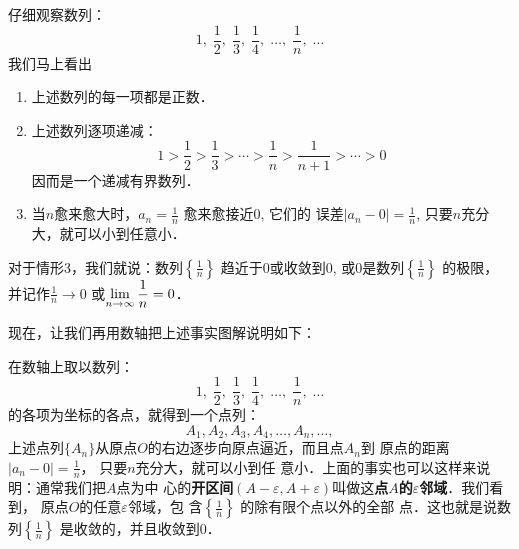 \begin{example}
    仔细观察数列：
    \[1,\; \frac{1}{2},\;\frac{1}{3},\;\frac{1}{4},\; \ldots,\;\frac{1}{n},\;\ldots\]
我们马上看出
\begin{enumerate}
    \item 上述数列的每一项都是正数．
    \item 上述数列逐项递减：
\[1>\frac{1}{2}>\frac{1}{3}>\cdots>\frac{1}{n}>\frac{1}{n+1}>\cdots>0\]
因而是一个递减有界数列．
\item 当$n$愈来愈大时，$a_n=\frac{1}{n}$
愈来愈接近0, 它们的
误差$|a_n-0|=\frac{1}{n}$, 只要$n$充分大，就可以小到任意小．
\end{enumerate}

对于情形3，我们就说：数列$\left\{\frac{1}{n}\right\}$
趋近于0或收敛到0, 或0是数列$\left\{\frac{1}{n}\right\}$
的极限，并记作$\frac{1}{n}\to 0$
或$\displaystyle\lim_{n\to\infty}\dfrac{1}{n}=0$．

现在，让我们再用数轴把上述事实图解说明如下：
\begin{figure}[htp]
    \centering
    \caption{}
\end{figure}

在数轴上取以数列：
\[1,\; \frac{1}{2},\;\frac{1}{3},\;\frac{1}{4},\; \ldots,\;\frac{1}{n},\;\ldots\]
的各项为坐标的各点，就得到一个点列：
\[A_1,A_2,A_3,A_4,\ldots,A_n,\ldots,\]
上述点列$\{A_n\}$从原点$O$的右边逐步向原点逼近，而且点$A_n$到
原点的距离$|a_n-0|=\frac{1}{n}$，
只要$n$充分大，就可以小到任
意小．上面的事实也可以这样来说明：通常我们把$A$点为中
心的\textbf{开区间}$(A-\varepsilon,A+\varepsilon)$叫做这\textbf{点$A$的$\varepsilon$邻域}．我们看到，
原点$O$的任意$\varepsilon$邻域，包
含$\left\{\frac{1}{n}\right\}$
的除有限个点以外的全部
点．这也就是说数列$\left\{\frac{1}{n}\right\}$
是收敛的，并且收敛到0．
\end{example}

